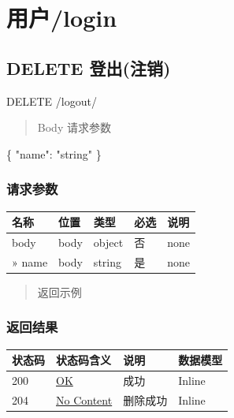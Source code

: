 \documentclass[
]{article}
\newenvironment{Shaded}{}{}
\newcommand{\DataTypeTok}[1]{\textcolor[rgb]{0.56,0.13,0.00}{#1}}
\newcommand{\FunctionTok}[1]{\textcolor[rgb]{0.02,0.16,0.49}{#1}}
\newcommand{\StringTok}[1]{\textcolor[rgb]{0.25,0.44,0.63}{#1}}
\begin{document}
\hypertarget{ux7528ux6237login}{%
\section{用户/login}\label{ux7528ux6237login}}

\hypertarget{delete-ux767bux51faux6ce8ux9500}{%
\subsection{DELETE 登出(注销)}\label{delete-ux767bux51faux6ce8ux9500}}

DELETE /logout/

\begin{quote}
Body 请求参数
\end{quote}

\begin{Shaded}
\begin{Highlighting}[]
\FunctionTok{\{}
  \DataTypeTok{"name"}\FunctionTok{:} \StringTok{"string"}
\FunctionTok{\}}
\end{Highlighting}
\end{Shaded}

\hypertarget{ux8bf7ux6c42ux53c2ux6570-18}{%
\subsubsection{请求参数}\label{ux8bf7ux6c42ux53c2ux6570-18}}

\begin{longtable}[]{@{}lllll@{}}
\toprule
名称 & 位置 & 类型 & 必选 & 说明 \\
\midrule
\endhead
body & body & object & 否 & none \\
» name & body & string & 是 & none \\
\bottomrule
\end{longtable}

\begin{quote}
返回示例
\end{quote}

\hypertarget{ux8fd4ux56deux7ed3ux679c-18}{%
\subsubsection{返回结果}\label{ux8fd4ux56deux7ed3ux679c-18}}

\begin{longtable}[]{@{}llll@{}}
\toprule
状态码 & 状态码含义 & 说明 & 数据模型 \\
\midrule
\endhead
200 & \href{https://tools.ietf.org/html/rfc7231\#section-6.3.1}{OK} &
成功 & Inline \\
204 & \href{https://tools.ietf.org/html/rfc7231\#section-6.3.5}{No
Content} & 删除成功 & Inline \\
\bottomrule
\end{longtable}
\end{document}
